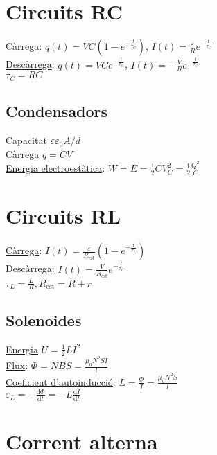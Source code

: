 \documentclass[10pt]{article}
\begin{document}
\raggedright
\begin{multicols}{5}

\section{Circuits RC}

\underline{Càrrega}: $q(t) = VC\left( 1 - e^{-\frac{t}{\tau_C}}\right)$, $I(t) = \frac{\varepsilon}{R} e^{-\frac{t}{\tau_C}}$ \\
\underline{Descàrrega}: $q(t) = VCe^{-\frac{t}{\tau_C}}$, $I(t) = -\frac{V}{R}e^{-\frac{t}{\tau_C}}$ \\

$\tau_C = RC$
\subsection{Condensadors}

\underline{Capacitat} $\varepsilon \varepsilon_0 A / d$ \\
\underline{Càrrega} $q = CV$ \\
\underline{Energia electroestàtica}: $W = E = \frac{1}{2}CV_C^2 = \frac{1}{2}\frac{Q^2}{C}$

\section{Circuits RL}
\underline{Càrrega}: $I(t) = \frac{\varepsilon}{R_{\text{est}}} \left(1 - e^{-\frac{t}{\tau_L}}\right)$ \\
\underline{Descàrrega}: $I(t) = \frac{V}{R_{\text{est}}}e^{-\frac{t}{\tau_L}}$ \\
$\tau_L = \frac{L}{R}, R_{\text{est}} = R + r$

\subsection{Solenoides}

\underline{Energia} $U = \frac{1}{2} L I^2$ \\ 
\underline{Flux}: $\Phi = NBS = \frac{\mu_0 N^2SI}{l}$ \\
\underline{Coeficient d'autoinducció}: $L = \frac{\Phi}{I} = \frac{\mu_0N^2S}{l}$ \\
$\varepsilon_L= -\frac{\text{d}\Phi}{\text{d}t} = -L \frac{\text{d}I}{\text{d}t}$

\section{Corrent alterna}


\end{multicols}
\end{document}

